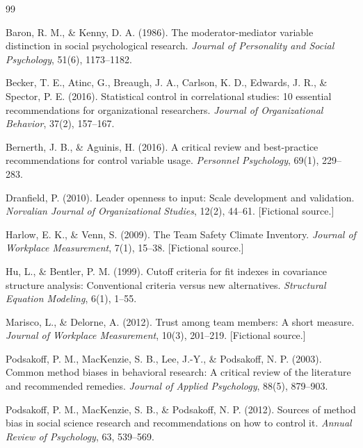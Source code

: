 \documentclass[11pt]{article}
\begin{document}
\begin{thebibliography}{99}
\setlength{\itemsep}{2pt}
\small

Baron, R. M., \& Kenny, D. A. (1986). The moderator-mediator variable distinction in social psychological research. \textit{Journal of Personality and Social Psychology}, 51(6), 1173--1182.

Becker, T. E., Atinc, G., Breaugh, J. A., Carlson, K. D., Edwards, J. R., \& Spector, P. E. (2016). Statistical control in correlational studies: 10 essential recommendations for organizational researchers. \textit{Journal of Organizational Behavior}, 37(2), 157--167.

Bernerth, J. B., \& Aguinis, H. (2016). A critical review and best-practice recommendations for control variable usage. \textit{Personnel Psychology}, 69(1), 229--283.

Dranfield, P. (2010). Leader openness to input: Scale development and validation. \textit{Norvalian Journal of Organizational Studies}, 12(2), 44--61. [Fictional source.]

Harlow, E. K., \& Venn, S. (2009). The Team Safety Climate Inventory. \textit{Journal of Workplace Measurement}, 7(1), 15--38. [Fictional source.]

Hu, L., \& Bentler, P. M. (1999). Cutoff criteria for fit indexes in covariance structure analysis: Conventional criteria versus new alternatives. \textit{Structural Equation Modeling}, 6(1), 1--55.

Marisco, L., \& Delorne, A. (2012). Trust among team members: A short measure. \textit{Journal of Workplace Measurement}, 10(3), 201--219. [Fictional source.]

Podsakoff, P. M., MacKenzie, S. B., Lee, J.-Y., \& Podsakoff, N. P. (2003). Common method biases in behavioral research: A critical review of the literature and recommended remedies. \textit{Journal of Applied Psychology}, 88(5), 879--903.

Podsakoff, P. M., MacKenzie, S. B., \& Podsakoff, N. P. (2012). Sources of method bias in social science research and recommendations on how to control it. \textit{Annual Review of Psychology}, 63, 539--569.


\end{thebibliography}
\end{document}
